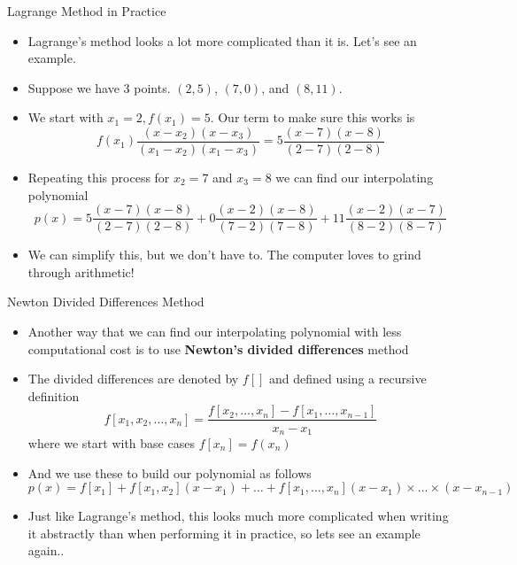 {}\documentclass[letterpaper,
compress,
xcolor=x11names,
]{beamer}
\begin{document}

\begin{frame}{Lagrange Method in Practice}
	\footnotesize
	\begin{itemize}
		\item Lagrange's method looks a lot more complicated than it is. Let's see an example.
		\item Suppose we have 3 points. $(2,5)$, $(7,0)$, and $(8,11)$.
		\item We start with $x_1 = 2, f(x_1) = 5$. Our term to make sure this works is 
		\begin{equation*}
			f(x_1)\frac{(x-x_2)(x-x_3)}{(x_1 - x_2)(x_1 - x_3)} = 5\frac{(x-7)(x-8)}{(2-7)(2-8)}
		\end{equation*}
		\item Repeating this process for $x_2 = 7$ and $x_3 = 8$ we can find our interpolating polynomial
		\begin{equation*}
			p(x) = 5\frac{(x-7)(x-8)}{(2-7)(2-8)} + 0\frac{(x-2)(x-8)}{(7-2)(7-8)} + 11\frac{(x-2)(x-7)}{(8-2)(8-7)}
		\end{equation*}
		\item We can simplify this, but we don't have to. The computer loves to grind through arithmetic!
	\end{itemize}
\end{frame}



\begin{frame}{Newton Divided Differences Method}
	\footnotesize
	\begin{itemize}
		\item Another way that we can find our interpolating polynomial with less computational cost is to use \textbf{Newton's divided differences} method
		\item The divided differences are denoted by $f[]$ and defined using a recursive definition
		\begin{equation*}
			f[x_1, x_2, \dots, x_n] = \frac{f[x_2,\dots,x_n] - f[x_1,\dots,x_{n-1}]}{x_n - x_1}
		\end{equation*}
		where we start with base cases $f[x_n] = f(x_n)$
		\item And we use these to build our polynomial as follows
		\begin{equation*}
			p(x) = f[x_1] + f[x_1,x_2](x-x_1) + \dots + f[x_1,\dots,x_n](x-x_1)\times\dots\times(x-x_{n-1})
		\end{equation*}
		\item Just like Lagrange's method, this looks much more complicated when writing it abstractly than when performing it in practice, so lets see an example again..
	\end{itemize}
\end{frame}
\end{document}
